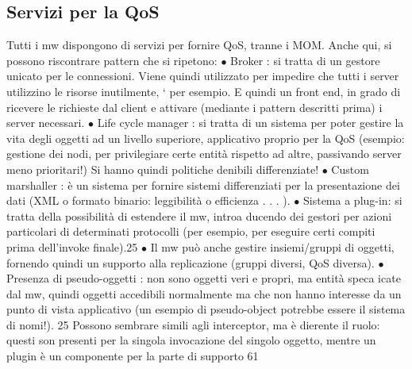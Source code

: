 \subsection{Servizi per la QoS}
Tutti i mw dispongono di servizi per fornire QoS, tranne i MOM. Anche qui, si
possono riscontrare pattern che si ripetono:
$\bullet$ Broker : si tratta di un gestore unicato per le connessioni. Viene quindi
utilizzato per impedire che tutti i server utilizzino le risorse inutilmente,
`
per esempio. E quindi un front end, in grado di ricevere le richieste dal
client e attivare (mediante i pattern descritti prima) i server necessari.
$\bullet$ Life cycle manager : si tratta di un sistema per poter gestire la vita degli
oggetti ad un livello superiore, applicativo proprio per la QoS (esempio:
gestione dei nodi, per privilegiare certe entità rispetto ad altre, passivando
server meno prioritari!) Si hanno quindi politiche denibili differenziate!
$\bullet$ Custom marshaller : è un sistema per fornire sistemi differenziati per la
presentazione dei dati (XML o formato binario: leggibilità o efficienza
. . . ).
$\bullet$ Sistema a plug-in: si tratta della possibilità di estendere il mw, introa
ducendo dei gestori per azioni particolari di determinati protocolli (per
esempio, per eseguire certi compiti prima dell'invoke finale).25
$\bullet$ Il mw può anche gestire insiemi/gruppi di oggetti, fornendo quindi un
supporto alla replicazione (gruppi diversi, QoS diversa).
$\bullet$ Presenza di pseudo-oggetti : non sono oggetti veri e propri, ma entità speca
icate dal mw, quindi oggetti accedibili normalmente ma che non hanno
interesse da un punto di vista applicativo (un esempio di pseudo-object
potrebbe essere il sistema di nomi!).
25 Possono sembrare simili agli interceptor, ma è dierente il ruolo: questi son presenti per
la singola invocazione del singolo oggetto, mentre un plugin è un componente per la parte di
supporto
61